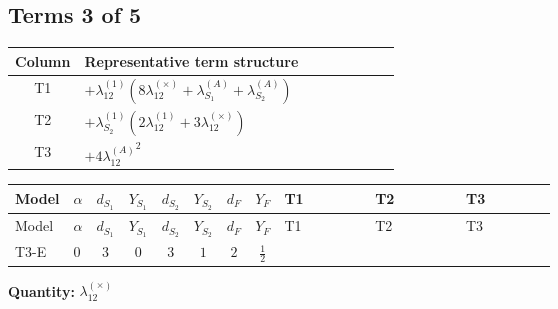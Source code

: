 \documentclass[8pt]{article}
\begin{document}
\begin{landscape}
\subsection*{Terms 3 of 5}
\begin{center}
\begin{tabular}{@{}c >{\raggedright\arraybackslash}p{0.82\linewidth}@{}}
\toprule
Column & Representative term structure \\
\midrule
T1 & \(\displaystyle +{\lambda_{12}^{(1)}} (8 {\lambda_{12}^{(\times)}}+{\lambda_{S_1}^{(A)}}+{\lambda_{S_2}^{(A)}})\) \\
\midrule
T2 & \(\displaystyle +{\lambda_{S_2}^{(1)}} (2 {\lambda_{12}^{(1)}}+3 {\lambda_{12}^{(\times)}})\) \\
\midrule
T3 & \(\displaystyle +4 {\lambda_{12}^{(A)}}^2\) \\
\midrule
\bottomrule
\end{tabular}
\end{center}
\smallskip
\tiny
\begin{longtable}{@{}llcccccc >{\raggedright\arraybackslash}p{0.21\linewidth} >{\raggedright\arraybackslash}p{0.21\linewidth} >{\raggedright\arraybackslash}p{0.21\linewidth}@{}}
\toprule
Model & $\alpha$ & $d_{S_1}$ & $Y_{S_1}$ & $d_{S_2}$ & $Y_{S_2}$ & $d_F$ & $Y_F$ & T1 & T2 & T3 \\
\midrule
\endfirsthead
\toprule
Model & $\alpha$ & $d_{S_1}$ & $Y_{S_1}$ & $d_{S_2}$ & $Y_{S_2}$ & $d_F$ & $Y_F$ & T1 & T2 & T3 \\
\midrule
\endhead
T3-E & $0$ & $3$ & $0$ & $3$ & $1$ & $2$ & $\frac{1}{2}$ & \scriptsize\adjustbox{max width=\linewidth}{$\begin{gathered} +{\lambda_{12}^{(1)}} (8 {\lambda_{12}^{(\times)}}+{\lambda_{S_1}^{(A)}}+{\lambda_{S_2}^{(A)}})\end{gathered}$} & \scriptsize\adjustbox{max width=\linewidth}{$\begin{gathered} +{\lambda_{S_2}^{(1)}} (2 {\lambda_{12}^{(1)}}+3 {\lambda_{12}^{(\times)}})\end{gathered}$} & \scriptsize\adjustbox{max width=\linewidth}{$\begin{gathered} +4 {\lambda_{12}^{(A)}}^2\end{gathered}$} \\
\midrule
\bottomrule
\end{longtable}
\clearpage
\noindent\textbf{Quantity: }$\lambda_{12}^{(\times)}$\par\smallskip

\end{landscape}
\end{document}
